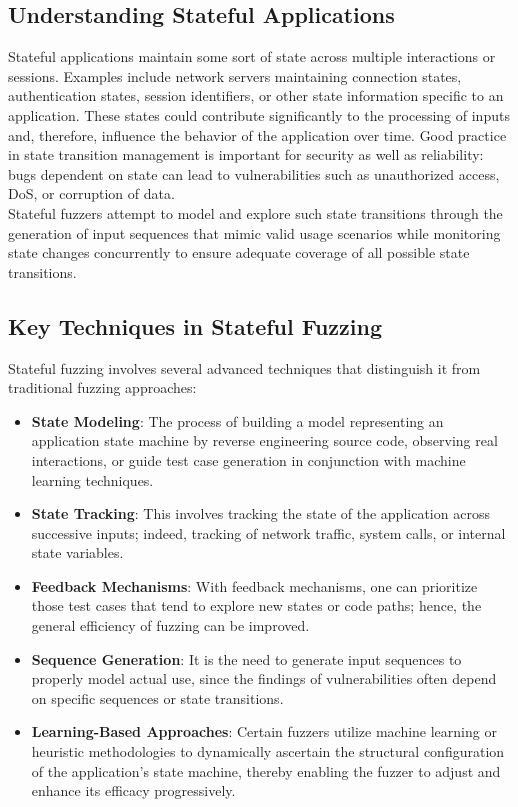 \subsection{Understanding Stateful Applications}
Stateful applications maintain some sort of state across multiple interactions or sessions. Examples include network servers maintaining connection states, authentication states, session identifiers, or other state information specific to an application. These states could contribute significantly to the processing of inputs and, therefore, influence the behavior of the application over time.
Good practice in state transition management is important for security as well as reliability: bugs dependent on state can lead to vulnerabilities such as unauthorized access, DoS, or corruption of data.
\\Stateful fuzzers attempt to model and explore such state transitions through the generation of input sequences that mimic valid usage scenarios while monitoring state changes concurrently to ensure adequate coverage of all possible state transitions.

\subsection{Key Techniques in Stateful Fuzzing}
Stateful fuzzing involves several advanced techniques that distinguish it from traditional fuzzing approaches:

\begin{itemize}
    \item \textbf{State Modeling}: The process of building a model representing an application state machine by reverse engineering source code, observing real interactions, or guide test case generation in conjunction with machine learning techniques.
    
    \item \textbf{State Tracking}: This involves tracking the state of the application across successive inputs; indeed, tracking of network traffic, system calls, or internal state variables.
    
    \item \textbf{Feedback Mechanisms}: With feedback mechanisms, one can prioritize those test cases that tend to explore new states or code paths; hence, the general efficiency of fuzzing can be improved.
    
    \item \textbf{Sequence Generation}: It is the need to generate input sequences to properly model actual use, since the findings of vulnerabilities often depend on specific sequences or state transitions.
    
    \item \textbf{Learning-Based Approaches}: Certain fuzzers utilize machine learning or heuristic methodologies to dynamically ascertain the structural configuration of the application's state machine, thereby enabling the fuzzer to adjust and enhance its efficacy progressively.
\end{itemize}


